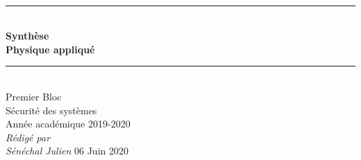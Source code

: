 \documentclass[a4paper]{article}
\newcommand{\HRule}{\rule{\linewidth}{0.5mm}}
\begin{document}
\begin{titlepage}
    \begin{sffamily}
        \begin{center}
            \textnormal{}\\[6.5cm]
            \HRule \\[0.4cm]
            { \Huge \bfseries Synthèse\\ Physique appliqué\\ [0.4cm] }
            \HRule \\[3cm]
            \Large
            Premier Bloc\\
            Sécurité des systèmes\\
            Année académique 2019-2020\\[0.5cm]
            \emph{Rédigé par}\\
            \emph{Sénéchal Julien}
            \vfill
            {\large 06 Juin 2020}
        \end{center}
    \end{sffamily}
\end{titlepage}
\end{document}
